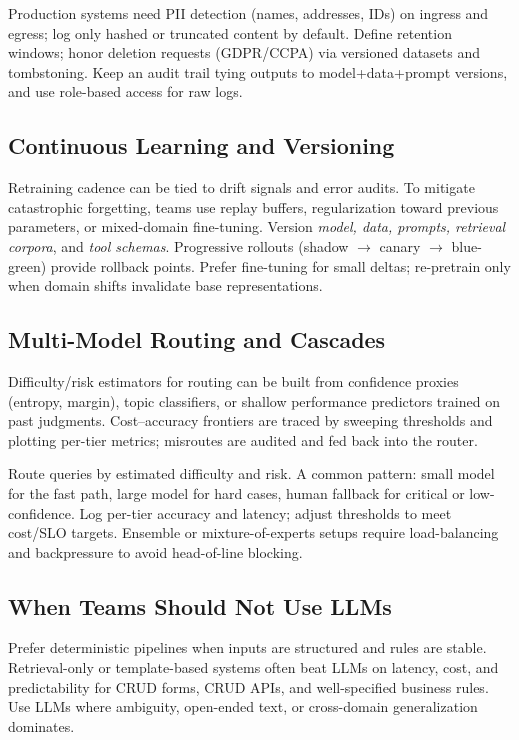 Production systems need PII detection (names, addresses, IDs) on ingress and egress; log only hashed or truncated content by default. Define retention windows; honor deletion requests (GDPR/CCPA) via versioned datasets and tombstoning. Keep an audit trail tying outputs to model+data+prompt versions, and use role-based access for raw logs.

\vspace{1em}
\subsection{Continuous Learning and Versioning}
\vspace{0.3cm}
Retraining cadence can be tied to drift signals and error audits. To mitigate catastrophic forgetting, teams use replay buffers, regularization toward previous parameters, or mixed-domain fine-tuning. Version \emph{model, data, prompts, retrieval corpora}, and \emph{tool schemas}. Progressive rollouts (shadow $\to$ canary $\to$ blue-green) provide rollback points. Prefer fine-tuning for small deltas; re-pretrain only when domain shifts invalidate base representations.

\vspace{1em}
\subsection{Multi-Model Routing and Cascades}
\vspace{0.3cm}
Difficulty/risk estimators for routing can be built from confidence proxies (entropy, margin), topic classifiers, or shallow performance predictors trained on past judgments. Cost--accuracy frontiers are traced by sweeping thresholds and plotting per-tier metrics; misroutes are audited and fed back into the router.

Route queries by estimated difficulty and risk. A common pattern: small model for the fast path, large model for hard cases, human fallback for critical or low-confidence. Log per-tier accuracy and latency; adjust thresholds to meet cost/SLO targets. Ensemble or mixture-of-experts setups require load-balancing and backpressure to avoid head-of-line blocking.

\vspace{1em}


\subsection{When Teams Should Not Use LLMs}
Prefer deterministic pipelines when inputs are structured and rules are stable. Retrieval-only or template-based systems often beat LLMs on latency, cost, and predictability for CRUD forms, CRUD APIs, and well-specified business rules. Use LLMs where ambiguity, open-ended text, or cross-domain generalization dominates.

